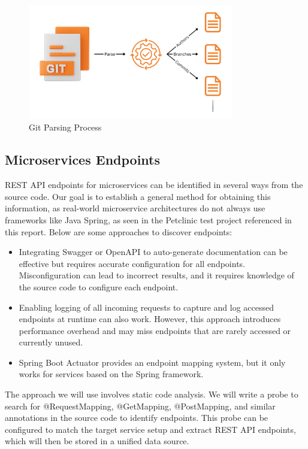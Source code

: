 \begin{figure}[H]
    \centering
    \includegraphics[width=0.8\textwidth]{figures/parse_git_file.png}
    \caption{Git Parsing Process}
    \label{fig_parse_git_file}
\end{figure}

\subsection{Microservices Endpoints}

REST API endpoints for microservices can be identified in several ways from the source code. Our goal is to establish a general method for obtaining this information, as real-world microservice architectures do not always use frameworks like Java Spring, as seen in the Petclinic test project referenced in this report. Below are some approaches to discover endpoints:

\begin{itemize}
    \item Integrating Swagger or OpenAPI to auto-generate documentation can be effective but requires accurate configuration for all endpoints. Misconfiguration can lead to incorrect results, and it requires knowledge of the source code to configure each endpoint.
    \item Enabling logging of all incoming requests to capture and log accessed endpoints at runtime can also work. However, this approach introduces performance overhead and may miss endpoints that are rarely accessed or currently unused.
    \item Spring Boot Actuator provides an endpoint mapping system, but it only works for services based on the Spring framework.
\end{itemize}

The approach we will use involves static code analysis. We will write a probe to search for @RequestMapping, @GetMapping, @PostMapping, and similar annotations in the source code to identify endpoints. This probe can be configured to match the target service setup and extract REST API endpoints, which will then be stored in a unified data source.

